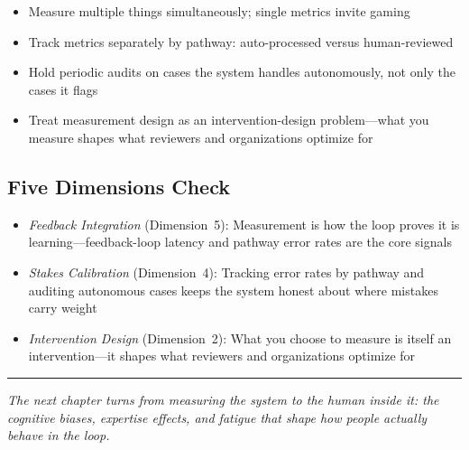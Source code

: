 \begin{itemize}
    \item Measure multiple things simultaneously; single metrics invite gaming
    \item Track metrics separately by pathway: auto-processed versus human-reviewed
    \item Hold periodic audits on cases the system handles autonomously, not only the cases it flags
    \item Treat measurement design as an intervention-design problem---what you measure shapes what reviewers and organizations optimize for
\end{itemize}

\subsection*{Five Dimensions Check}

\begin{itemize}
    \item \textit{Feedback Integration} (Dimension~5): Measurement is how the loop proves it is learning---feedback-loop latency and pathway error rates are the core signals
    \item \textit{Stakes Calibration} (Dimension~4): Tracking error rates by pathway and auditing autonomous cases keeps the system honest about where mistakes carry weight
    \item \textit{Intervention Design} (Dimension~2): What you choose to measure is itself an intervention---it shapes what reviewers and organizations optimize for
\end{itemize}

\bigskip
\begin{center}
\rule{0.5\textwidth}{0.4pt}
\end{center}
\bigskip

\noindent\textit{The next chapter turns from measuring the system to the human inside it: the cognitive biases, expertise effects, and fatigue that shape how people actually behave in the loop.}
